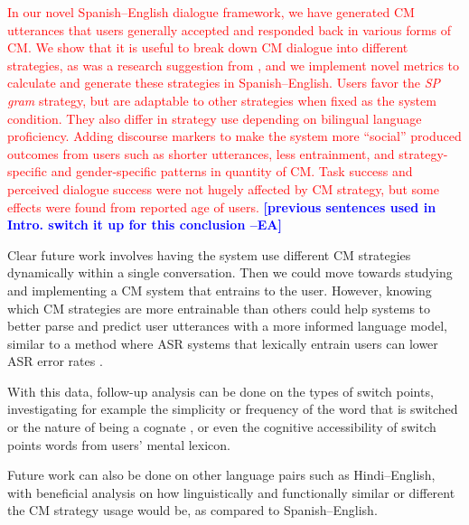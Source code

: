 \documentclass[11pt,a4paper]{article}
\newcommand{\ea}[1]{\textcolor{blue}{\bf\small [#1 --EA]}}
\newcommand{\red}[1]{\textcolor{red}{#1}}
\begin{document}
\red{In our novel Spanish--English dialogue framework, we have generated CM utterances that users generally accepted and responded back in various forms of CM.
We show that it is useful to break down CM dialogue into different strategies, as was a research suggestion from \citep{bullock2018should}, and we implement \red{novel} metrics to calculate and generate these strategies in Spanish--English.
Users favor the \textit{SP gram} strategy, but are adaptable to other strategies when fixed as the system condition.
They also differ in strategy use depending on bilingual language proficiency.
Adding discourse markers to make the system more ``social'' produced outcomes from users such as shorter utterances, less entrainment, and strategy-specific and gender-specific patterns in quantity of CM.
Task success and perceived dialogue success were not hugely affected by CM strategy, but some effects were found from reported age of users.}
\ea{previous sentences used in Intro. switch it up for this conclusion}


Clear future work involves having the system use different CM strategies dynamically within a single conversation. 
Then we could move towards studying and implementing a CM system that entrains to the user.
However, knowing which CM strategies are more entrainable than others could help systems to better parse and predict user utterances with a more informed language model, similar to a method where ASR systems that lexically entrain users can lower ASR error rates \citep{levitan2013entrainment}. 

With this data, follow-up analysis can be done on the types of switch points, investigating for example the simplicity or frequency of the word that is switched or the nature of being a cognate \citep{soto2018role}, or even the cognitive accessibility of switch points words from users' mental lexicon.

Future work can also be done on other language pairs such as Hindi--English, with beneficial analysis on how linguistically and functionally similar or different the CM strategy usage would be, as compared to Spanish--English.
\end{document}
